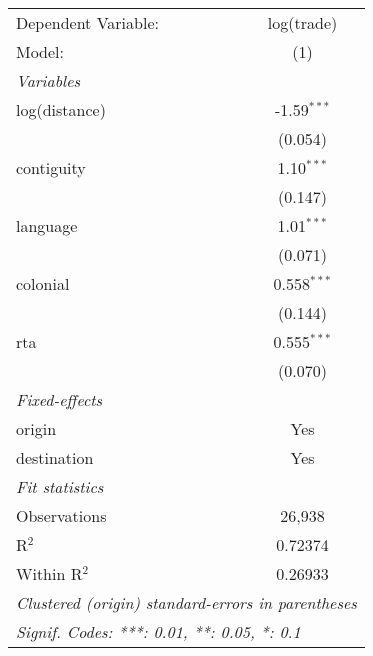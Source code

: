 
\begingroup
\centering
\begin{tabular}{lc}
   \tabularnewline \midrule \midrule
   Dependent Variable: & log(trade)\\  
   Model:              & (1)\\  
   \midrule
   \emph{Variables}\\
   log(distance)       & -1.59$^{***}$\\   
                       & (0.054)\\   
   contiguity          & 1.10$^{***}$\\   
                       & (0.147)\\   
   language            & 1.01$^{***}$\\   
                       & (0.071)\\   
   colonial            & 0.558$^{***}$\\   
                       & (0.144)\\   
   rta                 & 0.555$^{***}$\\   
                       & (0.070)\\   
   \midrule
   \emph{Fixed-effects}\\
   origin              & Yes\\  
   destination         & Yes\\  
   \midrule
   \emph{Fit statistics}\\
   Observations        & 26,938\\  
   R$^2$               & 0.72374\\  
   Within R$^2$        & 0.26933\\  
   \midrule \midrule
   \multicolumn{2}{l}{\emph{Clustered (origin) standard-errors in parentheses}}\\
   \multicolumn{2}{l}{\emph{Signif. Codes: ***: 0.01, **: 0.05, *: 0.1}}\\
\end{tabular}
\par\endgroup


